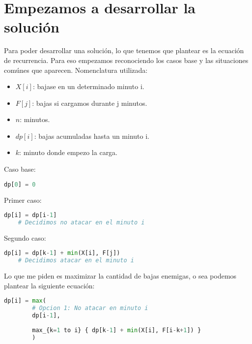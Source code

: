 \section{Empezamos a desarrollar la solución}
Para poder desarrollar una solución, lo que tenemos que plantear es la ecuación de recurrencia. Para eso empezamos reconociendo los casos base y las situaciones comúnes que aparecen.
Nomenclatura utilizada:
\begin{itemize}
\item $X[i]$:  bajase en un determinado minuto i.
\item $F[j]$: bajas si cargamos durante j minutos.
\item $n$: minutos.
\item $dp[i]$: bajas acumuladas hasta un minuto i.
\item $k$: minuto donde empezo la carga.
\end{itemize}
Caso base:
\begin{lstlisting}[language=Python]
    dp[0] = 0  
\end{lstlisting}
Primer caso:
\begin{lstlisting}[language=Python]
    dp[i] = dp[i-1]
    # Decidimos no atacar en el minuto i
\end{lstlisting}
Segundo caso:
\begin{lstlisting}[language=Python]
    dp[i] = dp[k-1] + min(X[i], F[j])
    # Decidimos atacar en el minuto i
\end{lstlisting}
Lo que me piden es maximizar la cantidad de bajas enemigas, o sea podemos plantear la siguiente ecuación:
\begin{lstlisting}[language=Python]
    dp[i] = max(
        # Opcion 1: No atacar en minuto i
        dp[i-1],  
        
        max_{k=1 to i} { dp[k-1] + min(X[i], F[i-k+1]) }
        )
\end{lstlisting}



